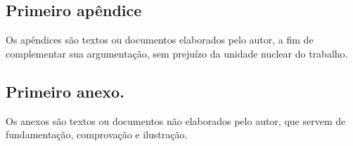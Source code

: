 \documentclass[
	12pt,			%
	openright,		%
	oneside,	
	a4paper,		%
	english,		%
	brazil			%
]{abntex2/abntex2}  %
\begin{document}
\begin{apendicesenv}

\chapter{Primeiro apêndice}

Os apêndices são textos ou documentos elaborados pelo autor, a fim de complementar sua argumentação, sem prejuízo da unidade nuclear do trabalho.

\end{apendicesenv}


\begin{anexosenv}

\chapter{Primeiro anexo.}

Os anexos são textos ou documentos não elaborados pelo autor, que servem de fundamentação, comprovação e ilustração.

\end{anexosenv}
\end{document}

